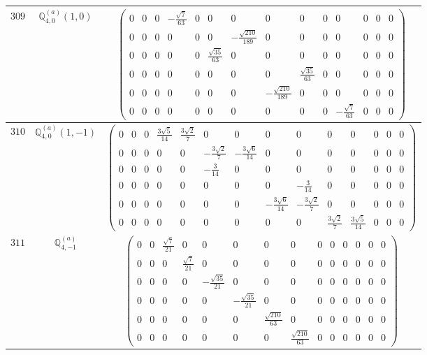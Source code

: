 \documentclass[fleqn,8pt,landscape]{jsarticle}
\begin{document}
\begin{center}
\begin{longtable}{ccc}
$ 309 $ & $ \mathbb{Q}_{4,0}^{(a)}(1,0) $ & $ \begin{pmatrix} 0 & 0 & 0 & - \frac{\sqrt{7}}{63} & 0 & 0 & 0 & 0 & 0 & 0 & 0 & 0 & 0 & 0 \\ 0 & 0 & 0 & 0 & 0 & 0 & - \frac{\sqrt{210}}{189} & 0 & 0 & 0 & 0 & 0 & 0 & 0 \\ 0 & 0 & 0 & 0 & 0 & \frac{\sqrt{35}}{63} & 0 & 0 & 0 & 0 & 0 & 0 & 0 & 0 \\ 0 & 0 & 0 & 0 & 0 & 0 & 0 & 0 & \frac{\sqrt{35}}{63} & 0 & 0 & 0 & 0 & 0 \\ 0 & 0 & 0 & 0 & 0 & 0 & 0 & - \frac{\sqrt{210}}{189} & 0 & 0 & 0 & 0 & 0 & 0 \\ 0 & 0 & 0 & 0 & 0 & 0 & 0 & 0 & 0 & 0 & - \frac{\sqrt{7}}{63} & 0 & 0 & 0 \end{pmatrix} $ \\ \hline
$ 310 $ & $ \mathbb{Q}_{4,0}^{(a)}(1,-1) $ & $ \begin{pmatrix} 0 & 0 & 0 & \frac{3 \sqrt{5}}{14} & \frac{3 \sqrt{2}}{7} & 0 & 0 & 0 & 0 & 0 & 0 & 0 & 0 & 0 \\ 0 & 0 & 0 & 0 & 0 & - \frac{3 \sqrt{2}}{7} & - \frac{3 \sqrt{6}}{14} & 0 & 0 & 0 & 0 & 0 & 0 & 0 \\ 0 & 0 & 0 & 0 & 0 & - \frac{3}{14} & 0 & 0 & 0 & 0 & 0 & 0 & 0 & 0 \\ 0 & 0 & 0 & 0 & 0 & 0 & 0 & 0 & - \frac{3}{14} & 0 & 0 & 0 & 0 & 0 \\ 0 & 0 & 0 & 0 & 0 & 0 & 0 & - \frac{3 \sqrt{6}}{14} & - \frac{3 \sqrt{2}}{7} & 0 & 0 & 0 & 0 & 0 \\ 0 & 0 & 0 & 0 & 0 & 0 & 0 & 0 & 0 & \frac{3 \sqrt{2}}{7} & \frac{3 \sqrt{5}}{14} & 0 & 0 & 0 \end{pmatrix} $ \\ \hline
$ 311 $ & $ \mathbb{Q}_{4,-1}^{(a)} $ & $ \begin{pmatrix} 0 & 0 & \frac{\sqrt{7}}{21} & 0 & 0 & 0 & 0 & 0 & 0 & 0 & 0 & 0 & 0 & 0 \\ 0 & 0 & 0 & \frac{\sqrt{7}}{21} & 0 & 0 & 0 & 0 & 0 & 0 & 0 & 0 & 0 & 0 \\ 0 & 0 & 0 & 0 & - \frac{\sqrt{35}}{21} & 0 & 0 & 0 & 0 & 0 & 0 & 0 & 0 & 0 \\ 0 & 0 & 0 & 0 & 0 & - \frac{\sqrt{35}}{21} & 0 & 0 & 0 & 0 & 0 & 0 & 0 & 0 \\ 0 & 0 & 0 & 0 & 0 & 0 & \frac{\sqrt{210}}{63} & 0 & 0 & 0 & 0 & 0 & 0 & 0 \\ 0 & 0 & 0 & 0 & 0 & 0 & 0 & \frac{\sqrt{210}}{63} & 0 & 0 & 0 & 0 & 0 & 0 \end{pmatrix} $ \\ \hline

\end{longtable}
\end{center}
\end{document}
